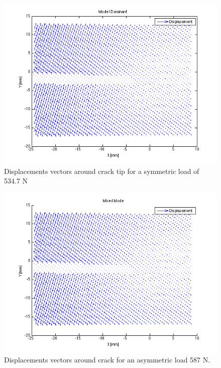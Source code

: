 \documentclass[12pt]{article}
\begin{document}
\begin{figure}[H]
	\centering
	\includegraphics[width=1.0\textwidth,scale=1]{QuiverModeI.png}
	\caption{Displacements vectors around crack tip for a symmetric load of 534.7 N }
	\label{fig:Quiver1}
\end{figure}

\begin{figure}[H]
	\centering
	\includegraphics[width=1.0\textwidth, scale=1]{quiverMixedMode.png}
	\caption{Displacements vectors around crack for an asymmetric load 587 N.}
	\label{fig:QuiverMix}
\end{figure}

\newpage
\end{document}
